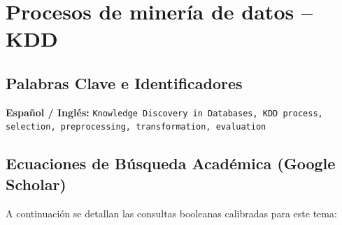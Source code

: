 \section{Procesos de minería de datos – KDD}
\label{sec:02_KDD}


\subsection{Palabras Clave e Identificadores}
\textbf{Español / Inglés:} \texttt{Knowledge Discovery in Databases, KDD process, selection, preprocessing, transformation, evaluation}


\subsection{Ecuaciones de Búsqueda Académica (Google Scholar)}
A continuación se detallan las consultas booleanas calibradas para este tema:

